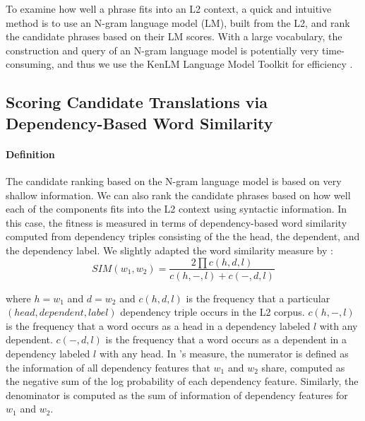 \documentclass[11pt]{article}
\begin{document}
To examine how well a phrase fits into an L2 context, a quick and intuitive method is to use an N-gram language model (LM), built from the L2, and rank the candidate phrases based on their LM scores. With a large vocabulary, the construction and query of an N-gram language model is potentially very time-consuming, and thus we use the KenLM Language Model Toolkit for efficiency \cite{heafield:kenlm:11}.


\subsection{Scoring Candidate Translations via Dependency-Based Word Similarity}
\label{sec:dependencySIM}

\paragraph{Definition} The candidate ranking based on the N-gram language model is based on very shallow information. We can also rank the candidate phrases based on how well each of the components fits into the L2 context using syntactic information. In this case, the fitness is measured in terms of dependency-based word similarity computed from dependency triples consisting of the the head, the dependent, and the dependency label. We slightly adapted the word similarity measure by :\\

\begin{equation}
SIM(w_1,w_2) = \frac{2 \prod c(h,d,l)} 
{c(h,-,l) + c(-,d,l)}
\end{equation}

\noindent
where $h=w_1$ and $d=w_2$ and 
$c(h,d,l)$ is the frequency that a particular $(head, dependent, label)$ dependency triple occurs in the L2 corpus. $c(h,-,l)$ is the frequency that a word occurs as a head in a dependency labeled $l$ with any dependent. $c(-,d,l)$ is the frequency that a word occurs as a dependent in a dependency labeled $l$  with any head. 
In \cite{lin:98}'s measure, the numerator is defined as the information of all dependency features that $w_1$ and $w_2$ share, computed as the negative sum of the log probability of each dependency feature. Similarly, the denominator is computed as the sum of information of dependency features for $w_1$ and $w_2$. \\
\end{document}
